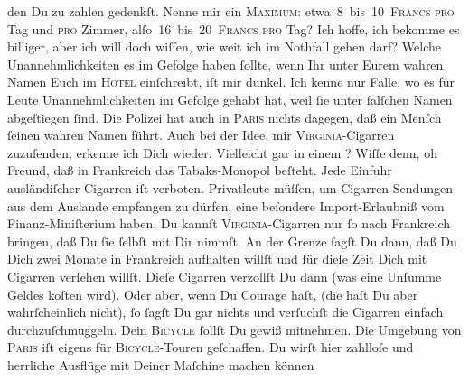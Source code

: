 \begin{ledgroupsized}[t]{13cm}
               den Du zu zahlen gedenkſt. \strikeout{\textcolor{gray}{Nenne}} Nenne mir ein \textsc{Maximum}: etwa 8 bis 10 \textsc{Francs}{ }\textsc{pro} Tag und \textsc{pro} Zimmer,
                  alſo 16 bis 20 \textsc{Francs}{ }\textsc{pro} Tag? Ich hoffe, ich bekomme es billiger, aber ich will
               doch wiſſen, wie weit ich im Nothfall gehen darf?\pend
           \pstart
           Welche Unannehmlichkeiten es im Gefolge haben ſollte, wenn Ihr unter Eurem wahren
               Namen Euch im \textsc{Hotel} einſchreibt, iſt mir dunkel. Ich kenne
               nur Fälle, wo es für Leute {\pb} Unannehmlichkeiten im Gefolge gehabt hat, weil ſie unter ſalſchen Namen
               abgeſtiegen ſind. Die Polizei hat auch in \textsc{Paris} nichts dagegen, daß ein Menſch ſeinen wahren Namen führt.\pend
           \pstart
           Auch bei der Idee, mir \textsc{Virginia}-Cigarren zuzuſenden,
               erkenne ich Dich wieder. Vielleicht gar in einem \label{K_L02806-2v}\label{K_L02806-2h}? Wiſſe denn, oh Freund, daß in Frankreich
               das Tabaks-Monopol beſteht. Jede Einfuhr 
               ausländiſcher Cigarren iſt verboten. Privatleute müſſen, um Cigarren-Sendungen  aus dem {\pb}Auslande
               empfangen zu dürfen, eine beſondere Import-Erlaubniß vom Finanz-Miniſterium haben. Du kannſt \textsc{Virginia}-Cigarren nur ſo nach Frankreich
               bringen, daß Du ſie ſelbſt mit Dir nimmſt. An der Grenze ſagſt Du dann, daß Du Dich
               zwei Monate in Frankreich aufhalten willſt und
               für dieſe Zeit Dich mit Cigarren verſehen willſt. Dieſe Cigarren verzollſt Du dann
               (was eine Unſumme  Geldes koſten wird). Oder aber,
               wenn Du Courage haſt, (die haſt Du aber wahrſcheinlich nicht), {\pb}ſo ſagſt Du gar nichts und verſuchſt die Cigarren
               einfach durchzuſchmuggeln.\pend
           \pstart
           Dein \textsc{Bicycle} ſollſt Du gewiß mitnehmen. Die Umgebung von
                  \textsc{Paris} iſt eigens für \textsc{Bicycle}-Touren geſchaffen. Du wirſt
               hier zahlloſe und herrliche Ausflüge mit Deiner Maſchine machen können{\dotsfive}\pend

\end{ledgroupsized}
